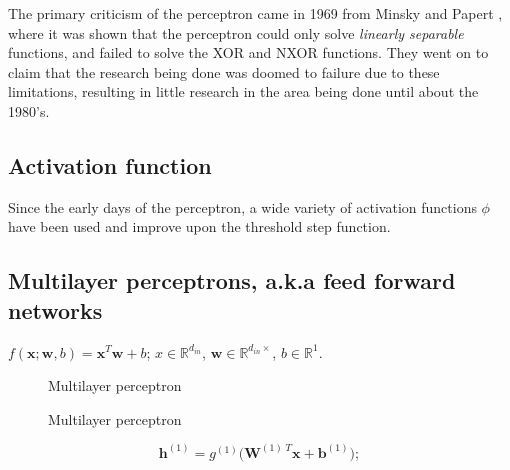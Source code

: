 The primary criticism of the perceptron came in 1969 from Minsky and Papert
\cite{minsky69perceptrons}, where it was shown that the perceptron could only
solve \textit{linearly separable} functions, and failed to solve the XOR and
NXOR functions. They went on to claim that the research being done was doomed to
failure due to these limitations, resulting in little research in the area being
done until about the 1980's.

\subsection{Activation function}

Since the early days of the perceptron, a wide variety of activation functions
$\phi$ have been used and improve upon the threshold step function.

%    


\subsection{Multilayer perceptrons, a.k.a feed forward networks}

$f(\mathbf{x};\mathbf{w}, b)=\mathbf{x}^T\mathbf{w}+b$; $x\in\mathbb{R}^{d_{in}}$, $\mathbf{w}\in\mathbb{R}^{d_{in}\times}$, $b\in\mathbb{R}^1$.

\begin{figure}
    \centering
    
    \caption{Multilayer perceptron}
    \label{fig:mlp}
\end{figure}


\begin{figure}
    \centering
    
    \caption{Multilayer perceptron}
    \label{fig:mlp-vec}
\end{figure}


\begin{equation}
    \mathbf{h}^{(1)} = g^{(1)} \bigg(\mathbf{W}^{{(1)}\;T}\mathbf{x} + \mathbf{b}^{(1)}\bigg);
\end{equation}

